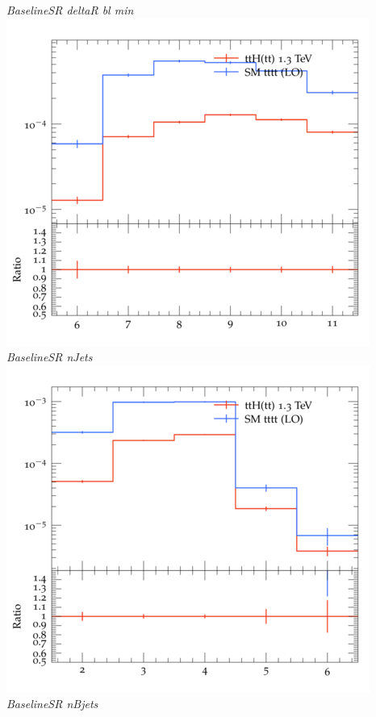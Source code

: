 \documentclass{beamer}
\begin{document}
\begin{frame}
\begin{columns}
\textit{\small BaselineSR deltaR bl min}
\includegraphics[width=\textwidth]{../plots/ttH_1300/tttt_ttH_1LOS/BaselineSR_nJets.png}\\
\textit{\small BaselineSR nJets}
\includegraphics[width=\textwidth]{../plots/ttH_1300/tttt_ttH_1LOS/BaselineSR_nBjets.png}\\
\textit{\small BaselineSR nBjets}
\end{columns}
\end{frame}
\end{document}
